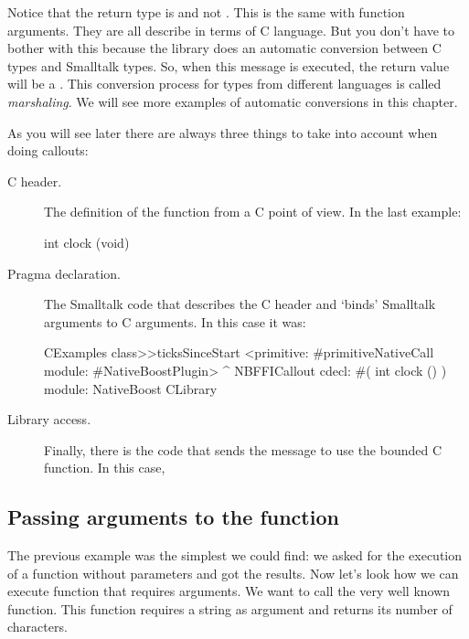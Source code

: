 \documentclass[a4paper,10pt,twoside]{book}
\begin{document}
Notice that the return type is  and not . 
This is the same with function arguments. 
They are all describe in terms of C language.
But you don't have to bother with this because the \Spock library does an automatic conversion between C types and Smalltalk types.
So, when this message is executed, the return value will be a . 
This conversion process for types from different languages is called \emph{marshaling}.
We will see more examples of automatic conversions in this chapter. 

As you will see later there are always three things to take into account when doing
callouts:

\begin{description}
\item [C header.] The definition of the function from a C point of view. In the last example:

\begin{code}{}
int clock (void)
\end{code}

\item [Pragma declaration.] The Smalltalk code that describes the C header and `binds' Smalltalk arguments to C arguments. In this case it was:

\begin{code}{}
CExamples class>>ticksSinceStart
	<primitive: #primitiveNativeCall module: #NativeBoostPlugin>
	^ NBFFICallout cdecl: #( int clock () ) module: NativeBoost CLibrary
\end{code}


\item [Library access.] Finally, there is the code that sends the message to use the bounded C function. In this case, 


\end{description}


\subsection{Passing arguments to the function}
The previous example was the simplest we could find: we asked for the execution of a function without parameters and got the results. Now let's look how we can execute function that requires arguments. 
We want to call the very well known  function. This function requires a string as argument and returns its number of characters. 
\end{document}
